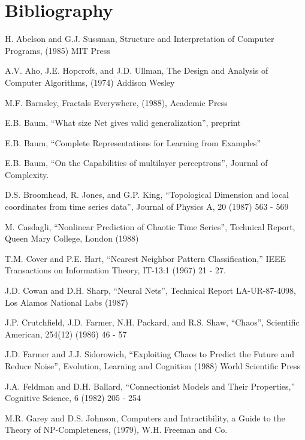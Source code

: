 \parskip 0.20in
\textheight 8.75in
\textwidth 6.0in
\topmargin -0.25in
\oddsidemargin 0.40in


\baselineskip 0.30in

\setcounter{page}{43}

\section{Bibliography}

H. Abelson and G.J. Sussman, Structure and Interpretation of Computer
Programs, (1985) MIT Press

A.V. Aho, J.E. Hopcroft, and J.D. Ullman, The Design and Analysis of
Computer Algorithms, (1974) Addison Wesley

M.F. Barnsley, Fractals Everywhere, (1988), Academic Press

E.B. Baum, ``What size Net gives valid generalization'', preprint

E.B. Baum, ``Complete Representations for Learning from Examples''

E.B. Baum, ``On the Capabilities of multilayer perceptrons'', Journal
of Complexity.

D.S. Broomhead, R. Jones, and G.P. King, ``Topological Dimension and
local coordinates from time series data'', Journal of Physics A,
20 (1987) 563 - 569

M. Casdagli, ``Nonlinear Prediction of Chaotic Time Series'', Technical
Report, Queen Mary College, London (1988)

T.M. Cover and P.E. Hart, ``Nearest Neighbor Pattern Classification,''
IEEE Transactions on Information Theory, IT-13:1 (1967) 21 - 27.

J.D. Cowan and D.H. Sharp, ``Neural Nets'', Technical Report
LA-UR-87-4098, Los Alamos National Labs (1987)

J.P. Crutchfield, J.D. Farmer, N.H. Packard, and R.S. Shaw, ``Chaos'',
Scientific American, 254(12) (1986) 46 - 57

J.D. Farmer and J.J. Sidorowich, ``Exploiting Chaos to Predict the
Future and Reduce Noise'', Evolution, Learning and Cognition (1988)
World Scientific Press 

J.A. Feldman and D.H. Ballard, ``Connectionist Models and Their
Properties,'' Cognitive Science, 6 (1982) 205 - 254

M.R. Garey and D.S. Johnson, Computers and Intractibility, a Guide to
the Theory of NP-Completeness, (1979), W.H. Freeman and Co.

